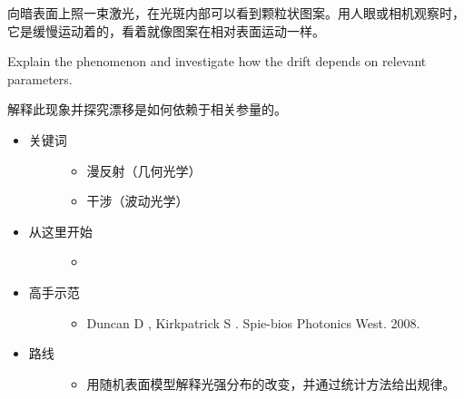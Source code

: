 \documentclass[a4paper,10pt,english]{sphinxmanual}
\begin{document}
向暗表面上照一束激光，在光斑内部可以看到颗粒状图案。用人眼或相机观察时，它是缓慢运动着的，看着就像图案在相对表面运动一样。

Explain the phenomenon and investigate how the drift depends on relevant parameters.

解释此现象并探究漂移是如何依赖于相关参量的。
\begin{itemize}
\item {} \begin{description}
\item[{关键词}] \leavevmode\begin{itemize}
\item {} 
漫反射（几何光学）

\item {} 
干涉（波动光学）

\end{itemize}

\end{description}

\item {} \begin{description}
\item[{从这里开始}] \leavevmode\begin{itemize}
\item {} 

\end{itemize}

\end{description}

\item {} \begin{description}
\item[{高手示范}] \leavevmode\begin{itemize}
\item {} 
Duncan D , Kirkpatrick S .  Spie-bios Photonics West. 2008.

\end{itemize}

\end{description}

\item {} \begin{description}
\item[{路线}] \leavevmode\begin{itemize}
\item {} 
用随机表面模型解释光强分布的改变，并通过统计方法给出规律。

\end{itemize}

\end{description}

\end{itemize}
\end{document}
